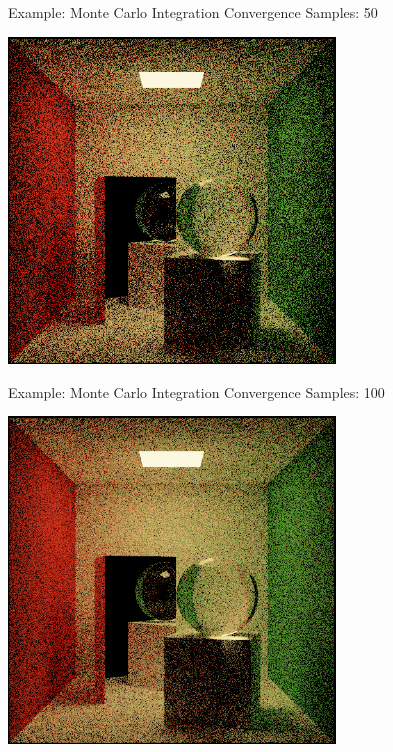\documentclass{beamer}
\begin{document}
\begin{frame}{Example: Monte Carlo Integration Convergence}
    Samples: 50
    \begin{center}
        \includegraphics[width=0.65\textwidth]{../img/convergence/cornell-00050.png}
    \end{center}
\end{frame}

\begin{frame}{Example: Monte Carlo Integration Convergence}
    Samples: 100
    \begin{center}
        \includegraphics[width=0.65\textwidth]{../img/convergence/cornell-00100.png}
    \end{center}
\end{frame}
\end{document}

